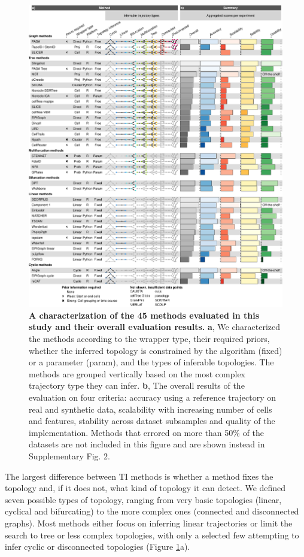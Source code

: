 \begin{figure}
	\centering\includegraphics[width=\linewidth]{fig/dynbenchmark/figure_2.pdf}
	\caption{
		\textbf{A characterization of the 45 methods evaluated in this study and their overall evaluation results.}
		\textbf{a}, We characterized the methods according to the wrapper type, their required priors, whether the inferred topology is constrained by the algorithm (fixed) or a parameter (param), and the types of inferable topologies. The methods are grouped vertically based on the most complex trajectory type they can infer. \textbf{b}, The overall results of the evaluation on four criteria: accuracy using a reference trajectory on real and synthetic data, scalability with increasing number of cells and features, stability across dataset subsamples and quality of the implementation. Methods that errored on more than 50$\%$ of the datasets are not included in this figure and are shown instead in Supplementary Fig. 2.
	}
	\label{fig:figure_2}
\end{figure}

The largest difference between TI methods is whether a method fixes the topology and, if it does not, what kind of topology it can detect. We defined seven possible types of topology, ranging from very basic topologies (linear, cyclical and bifurcating) to the more complex ones (connected and disconnected graphs). Most methods either focus on inferring linear trajectories or limit the search to tree or less complex topologies, with only a selected few attempting to infer cyclic or disconnected topologies (Figure \ref{fig:figure_2}a).

